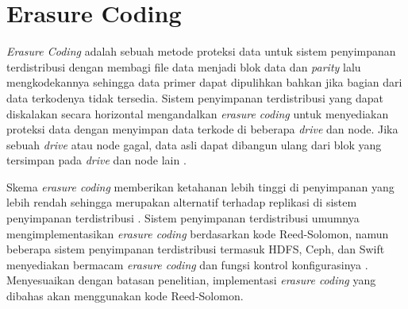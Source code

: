 \section{Erasure Coding}
\label{sec:erasure-coding}

\textit{Erasure Coding} adalah sebuah metode proteksi data untuk sistem penyimpanan terdistribusi dengan membagi file data menjadi blok data dan \textit{parity} lalu mengkodekannya sehingga data primer dapat dipulihkan bahkan jika bagian dari data terkodenya tidak tersedia. Sistem penyimpanan terdistribusi yang dapat diskalakan secara horizontal mengandalkan \textit{erasure coding} untuk menyediakan proteksi data dengan menyimpan data terkode di beberapa \textit{drive} dan node. Jika sebuah \textit{drive} atau node gagal, data asli dapat dibangun ulang dari blok yang tersimpan pada \textit{drive} dan node lain \parencite{minio2022erasure}.

Skema \textit{erasure coding} memberikan ketahanan lebih tinggi di penyimpanan yang lebih rendah sehingga merupakan alternatif terhadap replikasi di sistem penyimpanan terdistribusi \parencite{silberstein2014lazy}. Sistem penyimpanan terdistribusi umumnya mengimplementasikan \textit{erasure coding} berdasarkan kode Reed-Solomon, namun beberapa sistem penyimpanan terdistribusi termasuk HDFS, Ceph, dan Swift menyediakan bermacam \textit{erasure coding} dan fungsi kontrol konfigurasinya \parencite{kim2021erasure}. Menyesuaikan dengan batasan penelitian, implementasi \textit{erasure coding} yang dibahas akan menggunakan kode Reed-Solomon.





